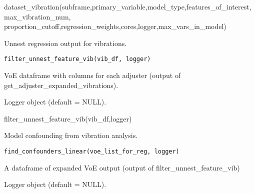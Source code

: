\documentclass[a4paper]{book}
\begin{document}
%
\begin{Examples}
\begin{ExampleCode}
dataset_vibration(subframe,primary_variable,model_type,features_of_interest,max_vibration_num, proportion_cutoff,regression_weights,cores,logger,max_vars_in_model)
\end{ExampleCode}
\end{Examples}
%
\begin{Description}\relax
Unnest regression output for vibrations.
\end{Description}
%
\begin{Usage}
\begin{verbatim}
filter_unnest_feature_vib(vib_df, logger)
\end{verbatim}
\end{Usage}
%
\begin{Arguments}
\begin{ldescription}
\item[\code{vib\_df}] VoE dataframe with columns for each adjuster (output of get\_adjuster\_expanded\_vibrations).

\item[\code{logger}] Logger object (default = NULL).
\end{ldescription}
\end{Arguments}
%
\begin{Examples}
\begin{ExampleCode}
filter_unnest_feature_vib(vib_df,logger)
\end{ExampleCode}
\end{Examples}
%
\begin{Description}\relax
Model confounding from vibration analysis.
\end{Description}
%
\begin{Usage}
\begin{verbatim}
find_confounders_linear(voe_list_for_reg, logger)
\end{verbatim}
\end{Usage}
%
\begin{Arguments}
\begin{ldescription}
\item[\code{voe\_list\_for\_reg}] A dataframe of expanded VoE output (output of filter\_unnest\_feature\_vib)

\item[\code{logger}] Logger object (default = NULL).
\end{ldescription}
\end{Arguments}
\end{document}
